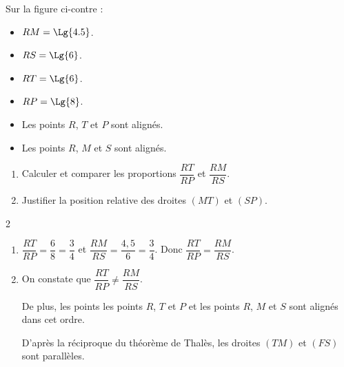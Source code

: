 \begin{exercice*}
    \phantom{rrr}

    \vspace*{-5mm}
    \begin{minipage}{0.65\linewidth}
        Sur la figure ci-contre :
        \begin{itemize}
            \item $RM=\Lg{4.5}$.
            \item $RS=\Lg{6}$.
            \item $RT=\Lg{6}$.
            \item $RP=\Lg{8}$.
            \item Les points $R$, $T$ et $P$ sont alignés.
            \item Les points $R$, $M$ et $S$ sont alignés.            
        \end{itemize}
    \end{minipage}
    \begin{minipage}{0.35\linewidth}        
    \end{minipage}
    \begin{enumerate}
        \item Calculer et comparer les proportions $\dfrac{RT}{RP}$ et $\dfrac{RM}{RS}$.
        
        \medskip
        \item Justifier la position relative des droites $(MT)$ et $(SP)$.
    \end{enumerate}
\end{exercice*}
\begin{corrige}
    \phantom{rrr}
    \begin{spacing}2
    \begin{enumerate}
        \item $\dfrac{RT}{RP}=\dfrac{6}{8}=\dfrac{3}{4}$ et $\dfrac{RM}{RS}=\dfrac{4,5}{6}=\dfrac{3}{4}$. Donc $\dfrac{RT}{RP}=\dfrac{RM}{RS}$.
        \item On constate que $\dfrac{RT}{RP}\neq\dfrac{RM}{RS}$.
        
        De plus, les points les points $R$, $T$ et $P$ et les points $R$, $M$ et $S$ sont alignés dans cet ordre.            

        D'après la réciproque du théorème de Thalès, les droites $(TM)$ et $(FS)$ sont parallèles.
    \end{enumerate}  
    \end{spacing}
\end{corrige}


